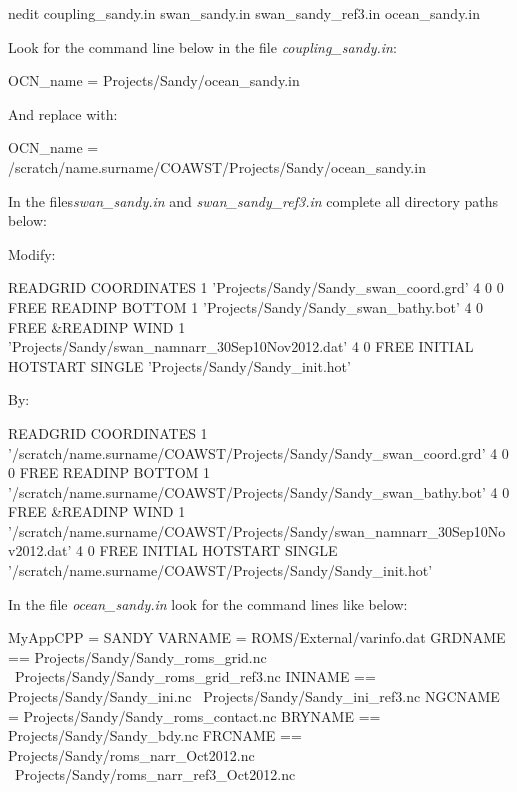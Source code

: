 \begin{bashcode}
nedit coupling_sandy.in swan_sandy.in swan_sandy_ref3.in ocean_sandy.in
\end{bashcode}
\bigskip

\noindent Look for the command line below in the file \textit{coupling\_sandy.in}:
\bigskip

\begin{bashcode}
OCN_name = Projects/Sandy/ocean_sandy.in
\end{bashcode}
\bigskip

\noindent And replace with:
\bigskip

\begin{bashcode}
OCN_name = /scratch/name.surname/COAWST/Projects/Sandy/ocean_sandy.in
\end{bashcode}
\bigskip

\noindent In the files\textit{swan\_sandy.in} and \textit{swan\_sandy\_ref3.in} complete all directory paths below:
\bigskip

\noindent Modify:
\bigskip

\begin{bashcode}
READGRID COORDINATES 1 'Projects/Sandy/Sandy_swan_coord.grd' 4 0 0 FREE
READINP BOTTOM 1 'Projects/Sandy/Sandy_swan_bathy.bot' 4 0 FREE
&READINP WIND 1 'Projects/Sandy/swan_namnarr_30Sep10Nov2012.dat' 4 0 FREE
INITIAL HOTSTART SINGLE 'Projects/Sandy/Sandy_init.hot'
\end{bashcode}
\bigskip

\noindent By:
\bigskip

\begin{bashcode}[fontsize=\scriptsize]
READGRID COORDINATES 1 '/scratch/name.surname/COAWST/Projects/Sandy/Sandy_swan_coord.grd' 4 0 0 FREE
READINP BOTTOM 1 '/scratch/name.surname/COAWST/Projects/Sandy/Sandy_swan_bathy.bot' 4 0 FREE
&READINP WIND 1 '/scratch/name.surname/COAWST/Projects/Sandy/swan_namnarr_30Sep10Nov2012.dat' 4 0 FREE
INITIAL HOTSTART SINGLE '/scratch/name.surname/COAWST/Projects/Sandy/Sandy_init.hot'
\end{bashcode}
\bigskip

\noindent In the file \textit{ocean\_sandy.in} look for the command lines like below:
\bigskip

\begin{bashcode}
MyAppCPP = SANDY
VARNAME  = ROMS/External/varinfo.dat
GRDNAME == Projects/Sandy/Sandy_roms_grid.nc \
           Projects/Sandy/Sandy_roms_grid_ref3.nc
ININAME == Projects/Sandy/Sandy_ini.nc \
           Projects/Sandy/Sandy_ini_ref3.nc
NGCNAME =  Projects/Sandy/Sandy_roms_contact.nc
BRYNAME == Projects/Sandy/Sandy_bdy.nc
FRCNAME == Projects/Sandy/roms_narr_Oct2012.nc \
           Projects/Sandy/roms_narr_ref3_Oct2012.nc
\end{bashcode}
\bigskip

